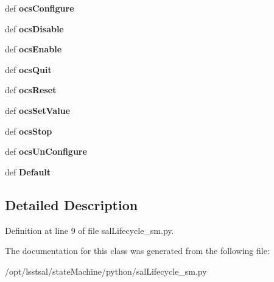 \begin{DoxyCompactItemize}
\item 
\hypertarget{classsal_lifecycle__sm_1_1sal_lifecycle_state_a5da676c49f4f1fa25af8adb85713fa1a}{def {\bfseries ocs\-Configure}}\label{classsal_lifecycle__sm_1_1sal_lifecycle_state_a5da676c49f4f1fa25af8adb85713fa1a}

\item 
\hypertarget{classsal_lifecycle__sm_1_1sal_lifecycle_state_af302c5fcd4ff69ee746535b9076dabcf}{def {\bfseries ocs\-Disable}}\label{classsal_lifecycle__sm_1_1sal_lifecycle_state_af302c5fcd4ff69ee746535b9076dabcf}

\item 
\hypertarget{classsal_lifecycle__sm_1_1sal_lifecycle_state_a3fd270a4f1e5617083362eed4d816d0a}{def {\bfseries ocs\-Enable}}\label{classsal_lifecycle__sm_1_1sal_lifecycle_state_a3fd270a4f1e5617083362eed4d816d0a}

\item 
\hypertarget{classsal_lifecycle__sm_1_1sal_lifecycle_state_a7e4677857f4cdf65db7f6034c060503c}{def {\bfseries ocs\-Quit}}\label{classsal_lifecycle__sm_1_1sal_lifecycle_state_a7e4677857f4cdf65db7f6034c060503c}

\item 
\hypertarget{classsal_lifecycle__sm_1_1sal_lifecycle_state_ac048a2fa00c0b849e4f2574d198136ac}{def {\bfseries ocs\-Reset}}\label{classsal_lifecycle__sm_1_1sal_lifecycle_state_ac048a2fa00c0b849e4f2574d198136ac}

\item 
\hypertarget{classsal_lifecycle__sm_1_1sal_lifecycle_state_a02bfbff33f38c7538eb6b9841490391e}{def {\bfseries ocs\-Set\-Value}}\label{classsal_lifecycle__sm_1_1sal_lifecycle_state_a02bfbff33f38c7538eb6b9841490391e}

\item 
\hypertarget{classsal_lifecycle__sm_1_1sal_lifecycle_state_a88fee5c44a603d1de73452386daa6841}{def {\bfseries ocs\-Stop}}\label{classsal_lifecycle__sm_1_1sal_lifecycle_state_a88fee5c44a603d1de73452386daa6841}

\item 
\hypertarget{classsal_lifecycle__sm_1_1sal_lifecycle_state_a31502cc7f0c32a727137f785df514619}{def {\bfseries ocs\-Un\-Configure}}\label{classsal_lifecycle__sm_1_1sal_lifecycle_state_a31502cc7f0c32a727137f785df514619}

\item 
\hypertarget{classsal_lifecycle__sm_1_1sal_lifecycle_state_a61de8d78b48c29b2bbddafa78ff1e7e6}{def {\bfseries Default}}\label{classsal_lifecycle__sm_1_1sal_lifecycle_state_a61de8d78b48c29b2bbddafa78ff1e7e6}

\end{DoxyCompactItemize}


\subsection{Detailed Description}


Definition at line 9 of file sal\-Lifecycle\-\_\-sm.\-py.



The documentation for this class was generated from the following file\-:\begin{DoxyCompactItemize}
\item 
/opt/lsstsal/state\-Machine/python/sal\-Lifecycle\-\_\-sm.\-py\end{DoxyCompactItemize}
